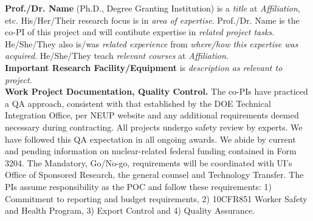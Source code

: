 \documentclass[11pt,letterpaper]{article}
\begin{document}
\noindent\textbf{Prof./Dr. Name} (Ph.D., Degree Granting Institution) is a \textit{title} at \textit{Affiliation}, etc. His/Her/Their research focus is in \textit{area of expertise}. Prof./Dr. Name is the co-PI of this project and will contibute expertise in \textit{related project tasks}. He/She/They also is/was \textit{related experience} from \textit{where/how this expertise was acquired}. He/She/They teach \textit{relevant courses} at \textit{Affiliation}.
\\

\noindent\textbf{Important Research Facility/Equipment} is \textit{description as relevant to project.}
\\

\noindent\textbf{Work Project Documentation, Quality Control.} The co-PIs have practiced a QA approach, consistent with that established by the DOE Technical Integration Office, per NEUP website and any additional requirements deemed necessary during contracting. All projects undergo safety review by experts. We have followed this QA expectation in all ongoing awards. We abide by current and pending information on nuclear-related federal funding contained in Form 3204. The Mandatory, Go/No-go, requirements will be coordinated with UI’s Office of Sponsored Research, the general counsel and Technology Transfer. The PIs assume responsibility as the POC and follow these requirements: 1) Commitment to reporting and budget requirements, 2) 10CFR851 Worker Safety and Health Program, 3) Export Control and 4) Quality Assurance.
\\
\end{document}
